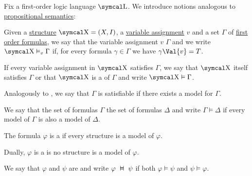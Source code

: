 \begin{definition}\label{def:first_order_semantics}
  Fix a first-order logic language \( \CL \). We introduce notions analogous to \hyperref[def:propositional_semantics]{propositional semantics}:
  \begin{DefEnum}
     Given a \hyperref[def:first_order_structure]{structure} \( \CX = (X, I) \), a \hyperref[def:first_order_valuation/variable_assignment]{variable assignment} \( v \) and a set \( \Gamma \) of \hyperref[def:first_order_language/formula]{first order formulas}, we say that the variable assignment \( v \)  \( \Gamma \) and we write \( \CX \vDash_v \Gamma \) if, for every formula \( \gamma \in \Gamma \) we have \( \gamma\Val{v} = T \).

    If every variable assignment in \( \CX \) satisfies \( \Gamma \), we say that \( \CX \) itself satisfies \( \Gamma \) or that \( \CX \) is a  of \( \Gamma \) and write \( \CX \vDash \Gamma \).

    Analogously to , we say that \( \Gamma \) is satisfiable if there exists a model for \( \Gamma \).

     We say that the set of formulas \( \Gamma \)  the set of formulas \( \Delta \) and write \( \Gamma \vDash \Delta \) if every model of \( \Gamma \) is also a model of \( \Delta \).

     The formula \( \varphi \) is a  if every structure is a model of \( \varphi \).

     Dually, \( \varphi \) is a  is no structure is a model of \( \varphi \).

     We say that \( \varphi \) and \( \psi \) are  and write \( \varphi \Sequiv \psi \) if both \( \varphi \vDash \psi \) and \( \psi \vDash \varphi \).
  \end{DefEnum}
\end{definition}

